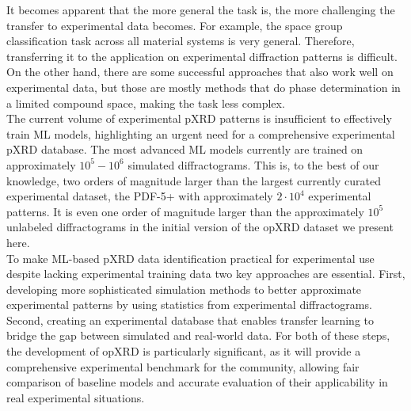 It becomes apparent that the more general the task is, the more challenging the transfer to experimental data becomes. For example, the space group classification task across all material systems is very general. Therefore, transferring it to the application on experimental diffraction patterns is difficult. \cite{Schopmans2023, Lee2022, Vecsei2018} On the other hand, there are some successful approaches that also work well on experimental data, but those are mostly methods that do phase determination in a limited compound space, making the task less complex. \cite{Schuetzke2024, Lee2020}\\

The current volume of experimental pXRD patterns is insufficient to effectively train ML models, highlighting an urgent need for a comprehensive experimental pXRD database. The most advanced ML models currently are trained on approximately $10^5 - 10^6$ simulated diffractograms. \cite{Salgado2023, Schopmans2023} This is, to the best of our knowledge, two orders of magnitude larger than the largest currently curated experimental dataset, the PDF-5+ with approximately $2\cdot 10^4$ experimental patterns. It is even one order of magnitude larger than the approximately $10^5$ unlabeled diffractograms in the initial version of the opXRD dataset we present here. \\

To make ML-based pXRD data identification practical for experimental use despite lacking experimental training data two key approaches are essential. First, developing more sophisticated simulation methods to better approximate experimental patterns\cite{cao2024simxrd} by using statistics from experimental diffractograms. Second, creating an experimental database that enables transfer learning to bridge the gap between simulated and real-world data. For both of these steps, the development of opXRD is particularly significant, as it will provide a comprehensive experimental benchmark for the community, allowing fair comparison of baseline models and accurate evaluation of their applicability in real experimental situations.

\pagebreak
